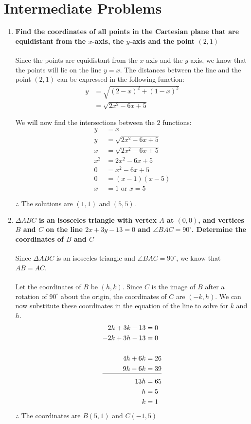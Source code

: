 \documentclass[12pt]{article}
\begin{document}
\section*{Intermediate Problems}
\begin{enumerate}
    \item \textbf{Find the coordinates of all points in the Cartesian plane that are equidistant from the $x$-axis, the $y$-axis and the point $(2, 1)$} \\ \\
    Since the points are equidistant from the $x$-axis and the $y$-axis, we know that the points will lie on the line $y=x$. The distances between the line and the point $(2, 1)$ can be expressed in the following function:
    \begin{align*}
        y &= \sqrt{(2 - x)^2 + (1 - x)^2} \\
        &= \sqrt{2x^2 - 6x + 5}
    \end{align*}
    
    We will now find the intersections between the $2$ functions:
    \begin{align*}
        y &= x \\
        y &= \sqrt{2x^2 - 6x + 5} \\
        x &= \sqrt{2x^2 - 6x + 5} \\
        x^2 & = 2x^2 - 6x + 5 \\
        0 &= x^2 - 6x + 5 \\
        0 &= (x - 1)(x - 5) \\
        x &= 1 \text{ or } x = 5
    \end{align*}    

    $\therefore$ The solutions are $(1, 1)$ and $(5, 5)$.
    
    \item \textbf{$\Delta ABC$ is an isosceles triangle with vertex $A$ at $(0, 0)$, and vertices $B$ and $C$ on the line $2x+3y-13 = 0$ and $\angle BAC = 90^{\circ}$. Determine the coordinates of $B$ and $C$} \\ \\
    Since $\Delta ABC$ is an isosceles triangle and $\angle BAC = 90^{\circ}$, we know that $AB = AC$. \\ \\
    Let the coordinates of $B$ be $(h, k)$. Since $C$ is the image of $B$ after a rotation of $90^{\circ}$ about the origin, the coordinates of $C$ are $(-k, h)$. We can now substitute these coordinates in the equation of the line to solve for $k$ and $h$.
    \begin{align*}
        2h+3k-13&=0 \\
        -2k+3h-13&=0 \\ \\
        4h+6k&=26 \\
        9h-6k&=39 \\[-11pt]
        \cline{1-2}
        13h&=65 \\
        h&=5 \\
        k&=1
    \end{align*}
    $\therefore$ The coordinates are $B(5, 1)$ and $C(-1, 5)$ \newpage
    
\end{enumerate}
\end{document}
